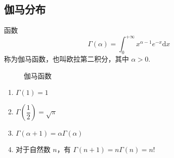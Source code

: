 \subsection{伽马分布}

\begin{definition}
    \indent 函数
    \begin{equation} \label{equation:gamma}
        \Gamma(\alpha) = \int_{0}^{+\infty} x^{\alpha - 1} e^{-x} \text{d}x
    \end{equation}
    称为{\heiti 伽马函数}，也叫{\heiti 欧拉第二积分}，其中 $\alpha > 0$.
\end{definition}

\begin{figure}[htbp]
    \centering


    \caption{伽马函数}
\end{figure}


\begin{property}[][伽马函数的性质]
    \begin{enumerate}
        \item $\Gamma(1) = 1$
        \item $\Gamma(\dfrac{1}{2}) = \sqrt{\pi}$
        \item $\Gamma(\alpha + 1) = \alpha \Gamma(\alpha)$
        \item 对于自然数 $n$，有 $\Gamma(n+1) = n \Gamma(n) = n!$
    \end{enumerate}
\end{property}


